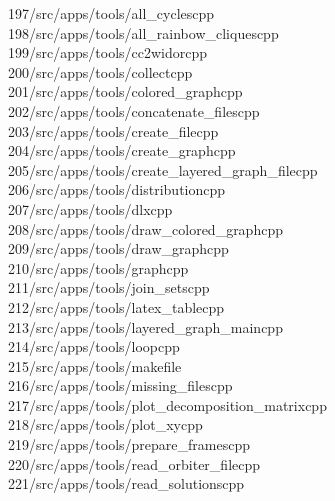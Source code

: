 \begin{tabbing}
197\>/src/apps/tools/all\_cyclescpp\\[0pt]
198\>/src/apps/tools/all\_rainbow\_cliquescpp\\[0pt]
199\>/src/apps/tools/cc2widorcpp\\[0pt]
200\>/src/apps/tools/collectcpp\\[0pt]
201\>/src/apps/tools/colored\_graphcpp\\[0pt]
202\>/src/apps/tools/concatenate\_filescpp\\[0pt]
203\>/src/apps/tools/create\_filecpp\\[0pt]
204\>/src/apps/tools/create\_graphcpp\\[0pt]
205\>/src/apps/tools/create\_layered\_graph\_filecpp\\[0pt]
206\>/src/apps/tools/distributioncpp\\[0pt]
207\>/src/apps/tools/dlxcpp\\[0pt]
208\>/src/apps/tools/draw\_colored\_graphcpp\\[0pt]
209\>/src/apps/tools/draw\_graphcpp\\[0pt]
210\>/src/apps/tools/graphcpp\\[0pt]
211\>/src/apps/tools/join\_setscpp\\[0pt]
212\>/src/apps/tools/latex\_tablecpp\\[0pt]
213\>/src/apps/tools/layered\_graph\_maincpp\\[0pt]
214\>/src/apps/tools/loopcpp\\[0pt]
215\>/src/apps/tools/makefile\\[0pt]
216\>/src/apps/tools/missing\_filescpp\\[0pt]
217\>/src/apps/tools/plot\_decomposition\_matrixcpp\\[0pt]
218\>/src/apps/tools/plot\_xycpp\\[0pt]
219\>/src/apps/tools/prepare\_framescpp\\[0pt]
220\>/src/apps/tools/read\_orbiter\_filecpp\\[0pt]
221\>/src/apps/tools/read\_solutionscpp\\[0pt]

\end{tabbing}
